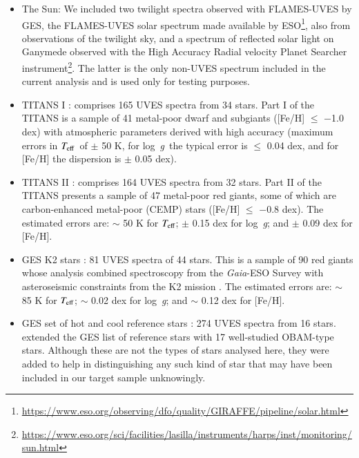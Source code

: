 \documentclass{aa}
\def\teff{$\textit{T}_{\rm{eff}}$}
\def\logg{\mbox{log~{\it g}}}
\begin{document}
\begin{itemize}

    \item The Sun: We included two twilight spectra observed with FLAMES-UVES by GES, the FLAMES-UVES solar spectrum made available by ESO\footnote{\url{https://www.eso.org/observing/dfo/quality/GIRAFFE/pipeline/solar.html}}, also from observations of the twilight sky, and a spectrum of reflected solar light on Ganymede observed with the High Accuracy Radial velocity Planet Searcher \citep[HARPS;][]{Mayor2003} instrument\footnote{\url{https://www.eso.org/sci/facilities/lasilla/instruments/harps/inst/monitoring/sun.html}}. The latter is the only non-UVES spectrum included in the current analysis and is used only for testing purposes. \\

    \item TITANS I \citep{2021A&A...650A.194G}: comprises 165 UVES spectra from 34 stars. Part I of the TITANS is a sample of 41 metal-poor dwarf and subgiants ([Fe/H] $\leq$ $-$1.0 dex) with atmospheric parameters derived with high accuracy (maximum errors in \teff\ of $\pm$ 50 K, for \logg\ the typical error is $\leq$ 0.04 dex, and for [Fe/H] the dispersion is $\pm$ 0.05 dex). 
    
    \item TITANS II \citep{2023A&A...679A.110G}: comprises 164 UVES spectra from 32 stars. Part II of the TITANS presents a sample of 47 metal-poor red giants, some of which are carbon-enhanced metal-poor (CEMP) stars ([Fe/H] $\leq$ $-$0.8 dex). The estimated errors are: $\sim$ 50 K for \teff; $\pm$ 0.15 dex for \logg; and $\pm$ 0.09 dex for [Fe/H].
        
    \item GES K2 stars \citep{2020A&A...643A..83W}: 81 UVES spectra of 44 stars. This is a sample of 90 red giants whose analysis combined spectroscopy from the \textit{Gaia}-ESO Survey with asteroseismic constraints from the K2 mission \citep{2014PASP..126..398H}. The estimated errors are: $\sim$ 85 K for \teff; $\sim$ 0.02 dex for \logg; and $\sim$ 0.12 dex for [Fe/H].
        
    \item GES set of hot and cool reference stars \citep[Tables 5 and 6 in][]{Pancino2017}: 274 UVES spectra from 16 stars. \citet{Pancino2017} extended the GES list of reference stars with 17 well-studied OBAM-type stars. Although these are not the types of stars analysed here, they were added to help in distinguishing any such kind of star that may have been included in our target sample unknowingly. 
    

\end{itemize}
\end{document}

